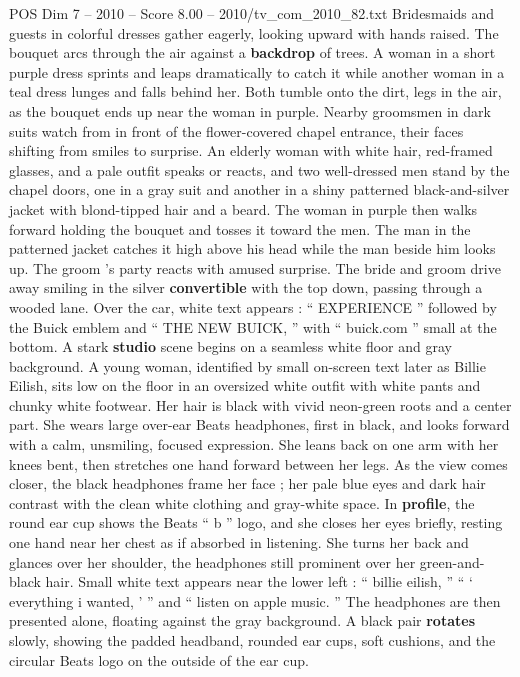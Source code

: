\begin{textsample}{POS Dim 7 – 2010 – Score 8.00 – 2010/tv\_com\_2010\_82.txt}
Bridesmaids and guests in colorful dresses gather eagerly, looking upward with hands raised.
The bouquet arcs through the air against a \textbf{backdrop} of trees.
A woman in a short purple dress sprints and leaps dramatically to catch it while another woman in a teal dress lunges and falls behind her.
Both tumble onto the dirt, legs in the air, as the bouquet ends up near the woman in purple.
Nearby groomsmen in dark suits watch from in front of the flower-covered chapel entrance, their faces shifting from smiles to surprise.
An elderly woman with white hair, red-framed glasses, and a pale outfit speaks or reacts, and two well-dressed men stand by the chapel doors, one in a gray suit and another in a shiny patterned black-and-silver jacket with blond-tipped hair and a beard.
The woman in purple then walks forward holding the bouquet and tosses it toward the men.
The man in the patterned jacket catches it high above his head while the man beside him looks up.
The groom ’s party reacts with amused surprise.
The bride and groom drive away smiling in the silver \textbf{convertible} with the top down, passing through a wooded lane.
Over the car, white text appears : “ EXPERIENCE ” followed by the Buick emblem and “ THE NEW BUICK, ” with “ buick.com ” small at the bottom.
A stark \textbf{studio} scene begins on a seamless white floor and gray background.
A young woman, identified by small on-screen text later as Billie Eilish, sits low on the floor in an oversized white outfit with white pants and chunky white footwear.
Her hair is black with vivid neon-green roots and a center part.
She wears large over-ear Beats headphones, first in black, and looks forward with a calm, unsmiling, focused expression.
She leans back on one arm with her knees bent, then stretches one hand forward between her legs.
As the view comes closer, the black headphones frame her face ; her pale blue eyes and dark hair contrast with the clean white clothing and gray-white space.
In \textbf{profile}, the round ear cup shows the Beats “ b ” logo, and she closes her eyes briefly, resting one hand near her chest as if absorbed in listening.
She turns her back and glances over her shoulder, the headphones still prominent over her green-and-black hair.
Small white text appears near the lower left : “ billie eilish, ” “ ‘ everything i wanted, ’ ” and “ listen on apple music. ” The headphones are then presented alone, floating against the gray background.
A black pair \textbf{rotates} slowly, showing the padded headband, rounded ear cups, soft cushions, and the circular Beats logo on the outside of the ear cup.

\end{textsample}
